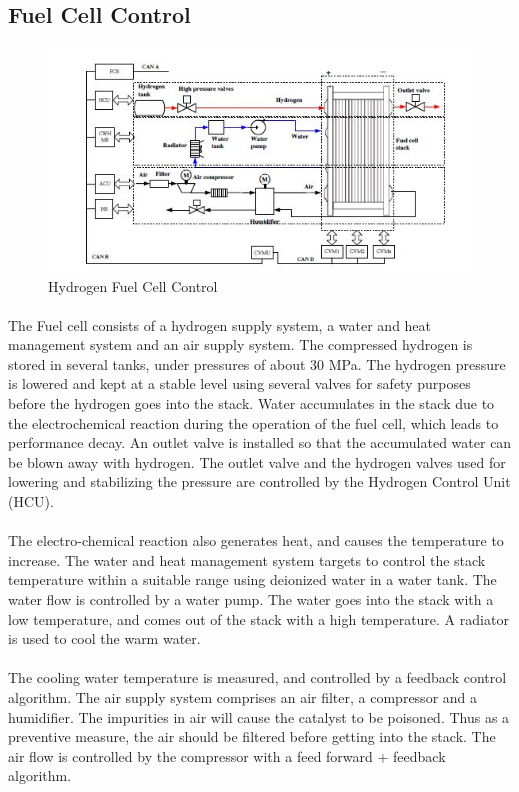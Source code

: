 \subsection{Fuel Cell Control}
\begin{figure}[!h]
\includegraphics{Figures/Figure7}
\caption{Hydrogen Fuel Cell Control
\cite{xu_hierarchical_2010}}
\end{figure}
\paragraph{}The Fuel cell consists of a hydrogen supply system, a water and heat management system and an air supply system. The compressed hydrogen is stored in several tanks, under  pressures of about 30 MPa. The hydrogen pressure is lowered and kept at a stable level using several valves for safety purposes before the hydrogen goes into the stack. Water accumulates in the stack due to the electrochemical reaction during the operation of the fuel cell, which leads to performance decay. An outlet valve is installed so that the accumulated water can be blown away with hydrogen. The outlet valve and the hydrogen valves used for lowering and stabilizing the pressure are controlled by the Hydrogen Control Unit (HCU).
\paragraph{}The electro-chemical reaction also generates heat, and causes the temperature to increase. The water and heat management system targets to control the stack temperature within a suitable range using deionized water in a water tank. The water flow is controlled by a water pump. The water goes into the stack with a low temperature, and comes out of the stack with a high temperature. A radiator is used to cool the warm water.
\paragraph{}The cooling water temperature is measured, and controlled by a feedback control algorithm.
The air supply system comprises an air filter, a compressor and a humidifier. The impurities in air will cause the catalyst to be poisoned. Thus as a preventive measure, the air should be filtered before getting into the stack. The air flow is controlled by the compressor with a feed forward + feedback algorithm. 
